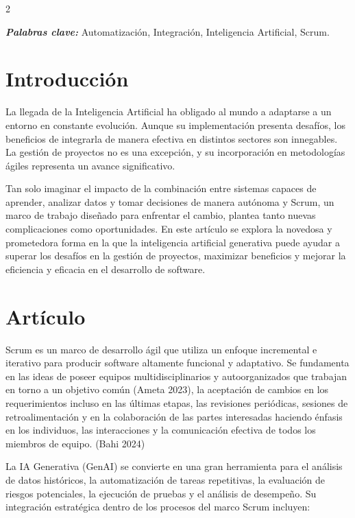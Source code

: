 \documentclass[12pt,spanish,Letterpaper,openany]{book}
\begin{document}
\begin {multicols}{2}

\textbf{\emph{Palabras clave:}} Automatización, Integración, Inteligencia Artificial, Scrum.

\hypertarget{introducciuxf3n-3}{%
\section{Introducción}\label{introducciuxf3n-3}}

La llegada de la Inteligencia Artificial ha obligado al mundo a adaptarse a un entorno
en constante evolución. Aunque su implementación presenta desafíos, los beneficios de
integrarla de manera efectiva en distintos sectores son innegables. La gestión de proyectos
no es una excepción, y su incorporación en metodologías ágiles representa un avance
significativo.

Tan solo imaginar el impacto de la combinación entre sistemas capaces de aprender,
analizar datos y tomar decisiones de manera autónoma y Scrum, un marco de trabajo
diseñado para enfrentar el cambio, plantea tanto nuevas complicaciones como oportunidades.
En este artículo se explora la novedosa y prometedora forma en la que la inteligencia artificial
generativa puede ayudar a superar los desafíos en la gestión de proyectos, maximizar
beneficios y mejorar la eficiencia y eficacia en el desarrollo de software.

\hypertarget{artuxedculo-3}{%
\section{Artículo}\label{artuxedculo-3}}

Scrum es un marco de desarrollo ágil que utiliza un enfoque incremental e iterativo
para producir software altamente funcional y adaptativo. Se fundamenta en las ideas de
poseer equipos multidisciplinarios y autoorganizados que trabajan en torno a un objetivo
común (Ameta 2023), la aceptación de cambios en los requerimientos incluso en las últimas
etapas, las revisiones periódicas, sesiones de retroalimentación y en la colaboración de las
partes interesadas haciendo énfasis en los individuos, las interacciones y la comunicación
efectiva de todos los miembros de equipo. (Bahi 2024)

La IA Generativa (GenAI) se convierte en una gran herramienta para el análisis de
datos históricos, la automatización de tareas repetitivas, la evaluación de riesgos potenciales,
la ejecución de pruebas y el análisis de desempeño. Su integración estratégica dentro de los
procesos del marco Scrum incluyen:


\end{multicols}
\end{document}
